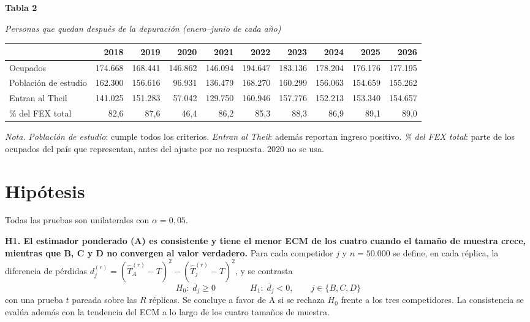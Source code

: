 \documentclass[12pt,letterpaper]{article}
\newcommand{\apa}[4]{%
  \singlespacing\raggedright
  {\bfseries #1\par}\vspace{0.4\baselineskip}
  {\itshape #2\par}\vspace{0.4\baselineskip}
  #3\par\vspace{0.3\baselineskip}
  {\small {\itshape Nota.} #4\par}}
\begin{document}
\begin{table}[!htb]
\apa{Tabla 2}{Personas que quedan después de la depuración (enero--junio de cada año)}{%
  \footnotesize\setlength{\tabcolsep}{3.5pt}
  \begin{tabular}{@{}lrrrrrrrrr@{}}
    \toprule
    & 2018 & 2019 & 2020 & 2021 & 2022 & 2023 & 2024 & 2025 & 2026 \\
    \midrule
    Ocupados             & 174.668 & 168.441 & 146.862 & 146.094 & 194.647 & 183.136 & 178.204 & 176.176 & 177.195 \\
    Población de estudio & 162.300 & 156.616 &  96.931 & 136.479 & 168.270 & 160.299 & 156.063 & 154.659 & 155.262 \\
    Entran al Theil      & 141.025 & 151.283 &  57.042 & 129.750 & 160.946 & 157.776 & 152.213 & 153.340 & 154.657 \\
    \% del FEX total     & 82,6 & 87,6 & 46,4 & 86,2 & 85,3 & 88,3 & 86,9 & 89,1 & 89,0 \\
    \bottomrule
  \end{tabular}}{%
  \emph{Población de estudio}: cumple todos los criterios. \emph{Entran al Theil}: además reportan ingreso positivo. \emph{\% del FEX total}: parte de los ocupados del país que representan, antes del ajuste por no respuesta. 2020 no se usa.}
\end{table}

\section{Hipótesis}

Todas las pruebas son unilaterales con $\alpha = 0,05$.

\textbf{H1. El estimador ponderado (A) es consistente y tiene el menor ECM de los cuatro cuando el tamaño de muestra crece, mientras que B, C y D no convergen al valor verdadero.} Para cada competidor $j$ y $n = 50.000$ se define, en cada réplica, la diferencia de pérdidas $d_j^{(r)} = (\hat{T}_A^{(r)} - T)^2 - (\hat{T}_j^{(r)} - T)^2$, y se contrasta
\begin{equation}
  H_0:\; \bar{d}_j \geq 0 \qquad\qquad H_1:\; \bar{d}_j < 0, \qquad j \in \{B, C, D\}
\end{equation}
con una prueba $t$ pareada sobre las $R$ réplicas. Se concluye a favor de A si se rechaza $H_0$ frente a los tres competidores. La consistencia se evalúa además con la tendencia del ECM a lo largo de los cuatro tamaños de muestra.
\end{document}
